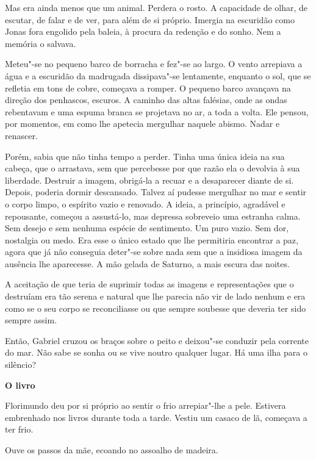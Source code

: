 Mas era ainda menos que um animal. Perdera o rosto. A capacidade de
olhar, de escutar, de falar e de ver, para além de si próprio. Imergia
na escuridão como Jonas fora engolido pela baleia, à procura da redenção
e do sonho. Nem a memória o salvava.

Meteu"-se no pequeno barco de borracha e fez"-se ao largo. O vento
arrepiava a água e a escuridão da madrugada dissipava"-se lentamente,
enquanto o sol, que se refletia em tons de cobre, começava a romper. O
pequeno barco avançava na direção dos penhascos, escuros. A caminho das
altas falésias, onde as ondas rebentavam e uma espuma branca se
projetava no ar, a toda a volta. Ele pensou, por momentos, em como lhe
apetecia mergulhar naquele abismo. Nadar e renascer.

Porém, sabia que não tinha tempo a perder. Tinha uma única ideia na sua
cabeça, que o arrastava, sem que percebesse por que razão ela o devolvia
à sua liberdade. Destruir a imagem, obrigá-la a recuar e a desaparecer
diante de si. Depois, poderia dormir descansado. Talvez aí pudesse
mergulhar no mar e sentir o corpo limpo, o espírito vazio e renovado. A
ideia, a princípio, agradável e repousante, começou a assustá-lo, mas
depressa sobreveio uma estranha calma. Sem desejo e sem nenhuma espécie
de sentimento. Um puro vazio. Sem dor, nostalgia ou medo. Era esse o
único estado que lhe permitiria encontrar a paz, agora que já não
conseguia deter"-se sobre nada sem que a insidiosa imagem da ausência lhe
aparecesse. A mão gelada de Saturno, a mais escura das noites.

A aceitação de que teria de suprimir todas as imagens e representações
que o destruíam era tão serena e natural que lhe parecia não vir de lado
nenhum e era como se o seu corpo se reconciliasse ou que sempre soubesse
que deveria ter sido sempre assim.

Então, Gabriel cruzou os braços sobre o peito e deixou"-se conduzir pela
corrente do mar. Não sabe se sonha ou se vive noutro qualquer lugar. Há
uma ilha para o silêncio?

\vspace*{1.8cm}
\noindent{}\textbf{O livro}

\bigskip

Florimundo deu por si próprio ao sentir o frio arrepiar"-lhe a pele.
Estivera embrenhado nos livros durante toda a tarde. Vestiu um casaco de
lã, começava a ter frio.

Ouve os passos da mãe, ecoando no assoalho de madeira.

